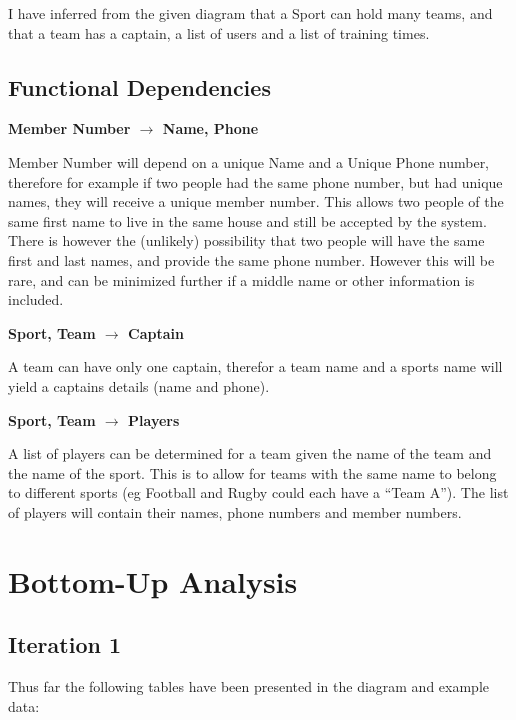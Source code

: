 \documentclass[10pt]{article}
\begin{document}
            I have inferred from the given diagram that a Sport can hold many teams, and that a team has a captain, a list of users and a list of training times.

            \subsection{Functional Dependencies}
                \begin{center}
                    \textbf{Member Number $\rightarrow$ Name, Phone}
                \end{center}
                Member Number will depend on a unique Name and a Unique Phone number, therefore for example if two people had the same phone number, but had unique names, they will receive a unique member number. This allows two people of the same first name to live in the same house and still be accepted by the system. There is however the (unlikely) possibility that two people will have the same first and last names, and provide the same phone number. However this will be rare, and can be minimized further if a middle name or other information is included.
                \begin{center}
                    \textbf{ Sport, Team $\rightarrow$ Captain }
                \end{center}

                A team can have only one captain, therefor a team name and a sports name will yield a captains details (name and phone). 

                \begin{center}
                    \textbf{Sport, Team $\rightarrow$ Players}
                \end{center}

                A list of players can be determined for a team given the name of the team and the name of the sport. This is to allow for teams with the same name to belong to different sports (eg Football and Rugby could each have a ``Team A''). The list of players will contain their names, phone numbers and member numbers.

        \section{Bottom-Up Analysis}
            
            \subsection{Iteration 1}
                Thus far the following tables have been presented in the diagram and example data:
\end{document}
